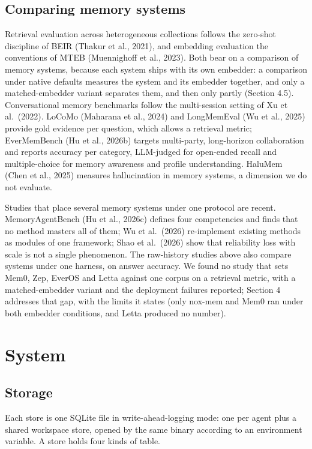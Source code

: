 \documentclass[a4paper,fleqn]{cas-sc}
\begin{document}
\subsection{Comparing memory systems}

Retrieval evaluation across heterogeneous collections follows the zero-shot discipline of BEIR (Thakur et al., 2021), and embedding evaluation the conventions of MTEB (Muennighoff et al., 2023). Both bear on a comparison of memory systems, because each system ships with its own embedder: a comparison under native defaults measures the system and its embedder together, and only a matched-embedder variant separates them, and then only partly (Section 4.5). Conversational memory benchmarks follow the multi-session setting of Xu et al.~(2022). LoCoMo (Maharana et al., 2024) and LongMemEval (Wu et al., 2025) provide gold evidence per question, which allows a retrieval metric; EverMemBench (Hu et al., 2026b) targets multi-party, long-horizon collaboration and reports accuracy per category, LLM-judged for open-ended recall and multiple-choice for memory awareness and profile understanding. HaluMem (Chen et al., 2025) measures hallucination in memory systems, a dimension we do not evaluate.

Studies that place several memory systems under one protocol are recent. MemoryAgentBench (Hu et al., 2026c) defines four competencies and finds that no method masters all of them; Wu et al.~(2026) re-implement existing methods as modules of one framework; Shao et al.~(2026) show that reliability loss with scale is not a single phenomenon. The raw-history studies above also compare systems under one harness, on answer accuracy. We found no study that sets Mem0, Zep, EverOS and Letta against one corpus on a retrieval metric, with a matched-embedder variant and the deployment failures reported; Section 4 addresses that gap, with the limits it states (only nox-mem and Mem0 ran under both embedder conditions, and Letta produced no number).

\section{System}

\subsection{Storage}

Each store is one SQLite file in write-ahead-logging mode: one per agent plus a shared workspace store, opened by the same binary according to an environment variable. A store holds four kinds of table.
\end{document}
